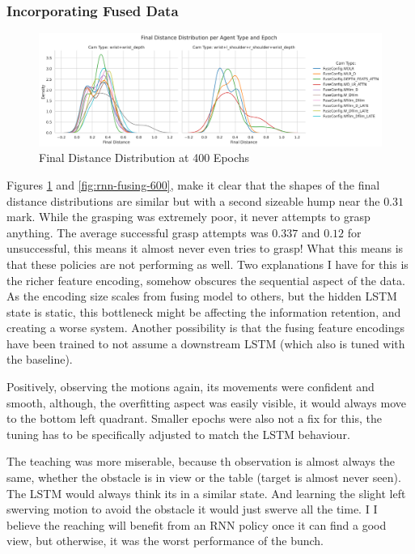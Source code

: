 \subsubsection{Incorporating Fused Data}

\begin{figure}[htpb]
  \centering
  \includegraphics[width=0.8\linewidth]{assets/evaluation/rnn/400-cams.png}
  \caption{Final Distance Distribution at 400 Epochs}\label{fig:rnn-fusing-400}
\end{figure}



Figures \ref{fig:rnn-fusing-400} and \ref{fig:rnn-fusing-600}, make it clear that the shapes of the final distance distributions are similar but with a second sizeable hump near the $0.31$ mark. While the grasping was extremely poor, it never attempts to grasp anything. The average successful grasp attempts was $0.337$ and $0.12$ for unsuccessful, this means it almost never even tries to grasp! What this means is that these policies are not performing as well. Two explanations I have for this is the richer feature encoding, somehow obscures the sequential aspect of the data. As the encoding size scales from fusing model to others, but the hidden LSTM state is static, this bottleneck might be affecting the information retention, and creating a worse system. Another possibility is that the fusing feature encodings have been trained to not assume a downstream LSTM (which also is tuned with the baseline).

Positively, observing the motions again, its movements were confident and smooth, although, the overfitting aspect was easily visible, it would always move to the bottom left quadrant. Smaller epochs were also not a fix for this, the tuning has to be specifically adjusted to match the LSTM behaviour.

The teaching was more miserable, because th observation is almost always the same, whether the obstacle is in view or the table (target is almost never seen). The LSTM would always think its in a similar state. And learning the slight left swerving motion to avoid the obstacle it would just swerve all the time. I I believe the reaching will benefit from an RNN policy once it can find a good view, but otherwise, it was the worst performance of the bunch.
